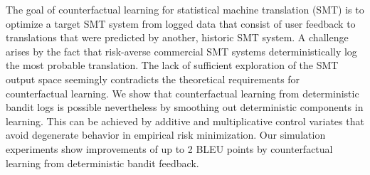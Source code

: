 The goal of counterfactual learning for statistical machine translation (SMT) is to optimize a target SMT system from logged data that consist of user feedback to translations that were predicted by another, historic SMT system. A challenge arises by the fact that risk-averse commercial SMT systems deterministically log the most probable translation. The lack of sufficient exploration of the SMT output space seemingly contradicts the theoretical requirements for counterfactual learning. We show that counterfactual learning from deterministic bandit logs is possible nevertheless by smoothing out deterministic components in learning. This can be achieved by additive and multiplicative control variates that avoid degenerate behavior in empirical risk minimization. Our simulation experiments show improvements of up to 2 BLEU points by counterfactual learning from deterministic bandit feedback.
